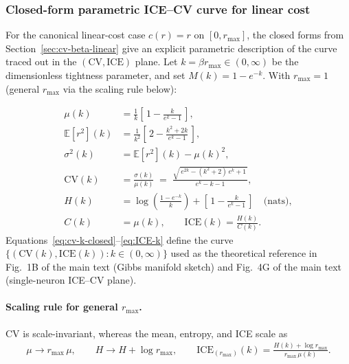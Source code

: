 \documentclass[11pt]{article}
\theoremstyle{remark}
\theoremstyle{definition}
\begin{document}
\subsubsection{Closed-form parametric ICE--CV curve for linear cost}
\label{sec:ice-cv-curve}

For the canonical linear-cost case $c(r)=r$ on $[0,r_{\max}]$, the closed forms from Section~\ref{sec:cv-beta-linear} give an explicit parametric description of the curve traced out in the $(\mathrm{CV},\mathrm{ICE})$ plane.  Let $k = \beta r_{\max} \in (0,\infty)$ be the dimensionless tightness parameter, and set $M(k)=1-e^{-k}$.  With $r_{\max}=1$ (general $r_{\max}$ via the scaling rule below):

\begin{align}
\mu(k) &= \frac{1}{k}\left[\,1-\frac{k}{e^k-1}\,\right], \label{eq:mu-k}\\[2pt]
\mathbb{E}[r^2](k) &= \frac{1}{k^2}\left[\,2-\frac{k^2+2k}{e^k-1}\,\right], \\[2pt]
\sigma^2(k) &= \mathbb{E}[r^2](k)-\mu(k)^2, \\[2pt]
\mathrm{CV}(k) &= \frac{\sigma(k)}{\mu(k)}
              \;=\; \frac{\sqrt{\,e^{2k}-(k^2+2)\,e^{k}+1\,}}{\,e^{k}-k-1\,}, \label{eq:cv-k-closed}\\[2pt]
H(k) &= \log\!\left(\frac{1-e^{-k}}{k}\right) + \left[\,1-\frac{k}{e^k-1}\,\right]\quad\text{(nats)}, \label{eq:H-k}\\[2pt]
C(k) &= \mu(k), \qquad \mathrm{ICE}(k) = \frac{H(k)}{C(k)}. \label{eq:ICE-k}
\end{align}
Equations~\eqref{eq:cv-k-closed}--\eqref{eq:ICE-k} define the curve $\{(\mathrm{CV}(k),\mathrm{ICE}(k)):k\in(0,\infty)\}$ used as the theoretical reference in Fig.~1B of the main text (Gibbs manifold sketch) and Fig.~4G of the main text (single-neuron ICE--CV plane).

\paragraph{Scaling rule for general $r_{\max}$.}
CV is scale-invariant, whereas the mean, entropy, and ICE scale as
\begin{align}
\mu \to r_{\max}\,\mu, \qquad
H \to H + \log r_{\max}, \qquad
\mathrm{ICE}_{(r_{\max})}(k) = \frac{H(k) + \log r_{\max}}{r_{\max}\,\mu(k)}.
\label{eq:rmax-scaling}
\end{align}
\end{document}
